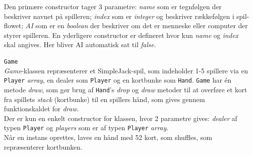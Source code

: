 \documentclass[a4paper]{article}
\begin{document}
\begin{description}
        Den primære constructor tager 3 parametre: \textit{name} som er tegnfølgen der beskriver navnet 
        på spilleren; \textit{index} som er \textit{integer} og beskriver rækkefølgen i spil-flowet; 
        \textit{AI} som er en \textit{boolean} der beskriver om det er menneske eller computer der 
        styrer spilleren. En yderligere constructor er defineret hvor kun \textit{name} og 
        \textit{index} skal angives. Her bliver AI automatisk sat til \textit{false}.
        
        \item{\texttt{Game}}~\\
        \textit{Game}-klassen repræsenterer et SimpleJack-spil, som indeholder 1-5 spillere via en 
        \texttt{Player} \textit{array}, en dealer som \texttt{Player} og en kortbunke som \texttt{Hand}.
        \texttt{Game} har én metode \textit{draw}, som gør brug af \texttt{Hand}'s \textit{drop} og 
        \textit{draw} metoder til at overføre et kort fra spillets \textit{stack} (kortbunke) til en 
        spillers hånd, som gives gennem funktionskaldet for \textit{draw}.\\
        Der er kun en enkelt constructor for klassen, hvor 2 parametre gives: \textit{dealer} af typen 
        \texttt{Player} og \textit{players} som er af typen \texttt{Player} \textit{array}.\\
        Når en instans oprettes, laves en hånd med 52 kort, som shuffles, som repræsenterer kortbunken.
        
      \end{description}
    
\end{document}
